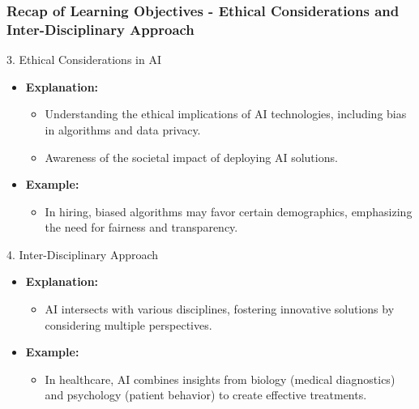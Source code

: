 \documentclass[aspectratio=169]{beamer}
\begin{document}
\begin{frame}[fragile]
    \frametitle{Recap of Learning Objectives - Ethical Considerations and Inter-Disciplinary Approach}
    \begin{block}{3. Ethical Considerations in AI}
        \begin{itemize}
            \item \textbf{Explanation:}
            \begin{itemize}
                \item Understanding the ethical implications of AI technologies, including bias in algorithms and data privacy.
                \item Awareness of the societal impact of deploying AI solutions.
            \end{itemize}
            \item \textbf{Example:}
            \begin{itemize}
                \item In hiring, biased algorithms may favor certain demographics, emphasizing the need for fairness and transparency.
            \end{itemize}
        \end{itemize}
    \end{block}
    
    \begin{block}{4. Inter-Disciplinary Approach}
        \begin{itemize}
            \item \textbf{Explanation:}
            \begin{itemize}
                \item AI intersects with various disciplines, fostering innovative solutions by considering multiple perspectives.
            \end{itemize}
            \item \textbf{Example:}
            \begin{itemize}
                \item In healthcare, AI combines insights from biology (medical diagnostics) and psychology (patient behavior) to create effective treatments.
            \end{itemize}
        \end{itemize}
    \end{block}
\end{frame}
\end{document}
